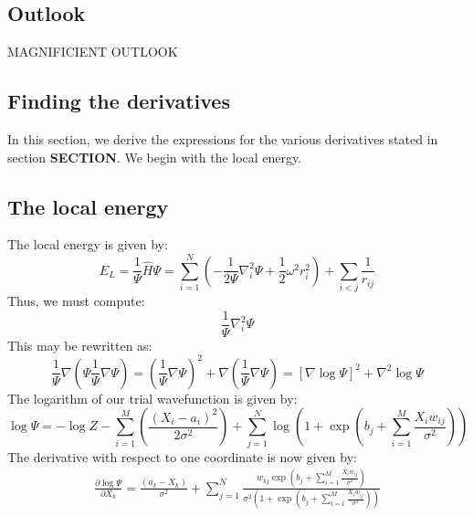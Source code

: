 \documentclass[a4paper, 10pt]{article}
\begin{document}
	\subsection{Outlook}
	MAGNIFICIENT OUTLOOK
	
	
	\pagebreak
	\begin{appendices}
	\section{Finding the derivatives}\label{ap:finding_derivatives}
	In this section, we derive the expressions for the various derivatives stated in section \textbf{SECTION}. We begin with the local energy.
	\subsection{The local energy}
	The local energy is given by:
	\begin{equation}
	E_L=\frac{1}{\Psi}\hat{H}\Psi= \sum_{i=1}^N \left(-\frac{1}{2\Psi}\nabla_i^2 \Psi + \frac{1}{2}\omega^2 r_i^2\right)+\sum_{i<j} \frac{1}{r_{ij}}
	\end{equation}
	Thus, we must compute:
	\begin{equation}
	\frac{1}{\Psi}\nabla_i^2 \Psi
	\end{equation}
	This may be rewritten as:
	\begin{equation}\label{eq:log_expression_for_trial_wavefunction}
	\frac{1}{\Psi}\nabla \left(\Psi \frac{1}{\Psi} \nabla\Psi\right)=\left(\frac{1}{\Psi}\nabla \Psi\right)^2+\nabla \left(\frac{1}{\Psi}\nabla \Psi \right)=\left[\nabla \log \Psi\right]^2 + \nabla^2 \log \Psi
	\end{equation}
	The logarithm of our trial wavefunction is given by:
	\begin{equation}\label{eq:logarithm_of_wavefunction}
	\log \Psi = -\log Z -\sum_{i=1}^M \left(\frac{(X_i-a_i)^2}{2\sigma^2}\right)+\sum_{j=1}^N \log \left(1+\exp \left(b_j+\sum_{i=1}^{M} \frac{X_iw_{ij}}{\sigma^2}\right)\right)
	\end{equation}
	The derivative with respect to one coordinate is now given by:
	\begin{equation}\label{eq:first_derivative_log_psi}
	\begin{split}
	\frac{\partial \log \Psi}{\partial X_k}=\frac{(a_k-X_k)}{\sigma^2}+\sum_{j=1}^N \frac{w_{kj} \exp \left(b_j+\sum_{i=1}^{M} \frac{X_iw_{ij}}{\sigma^2}\right)}{\sigma^2 \left(1+\exp \left(b_j+\sum_{i=1}^{M} \frac{X_iw_{ij}}{\sigma^2}\right)\right)}\\

\end{split}
\end{equation}
\end{appendices}
\end{document}
